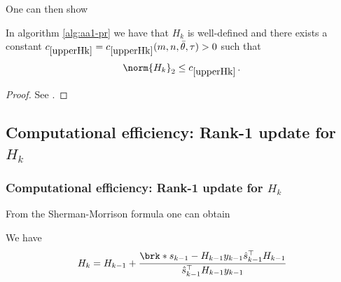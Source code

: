 
\begin{frame}
	One can then show
	\begin{lemma}
		In algorithm \ref{alg:aa1-pr} we have that $H_k$ is well-defined and there exists a constant $\useconstant{upperHk}=\useconstant{upperHk}(m,n, \bartheta,\tau)>0$ such that
		\begin{align*}
			\norm{H_k}_2\leq \useconstant{upperHk}\,.
		\end{align*}
	\end{lemma}
	\begin{proof}
		See \cite[Corollary 4]{ZhaAA}.
	\end{proof}
\end{frame}

\begin{frame}
	\centering
	\scalebox{0.9}{
	
	}
\end{frame}

\subsection{Computational efficiency: Rank-1 update for $H_k$}

\begin{frame}
	\frametitle{Computational efficiency: Rank-1 update for $H_k$}
	From the Sherman-Morrison formula one can obtain
	\begin{proposition}
		We have
		\begin{align*}
			H_{k} = H_{k-1}+\frac{\brk*{s_{k-1}-H_{k-1}y_{k-1}}\hs_{k-1}^\top H_{k-1}}{\hs_{k-1}^\top H_{k-1}y_{k-1}}
		\end{align*}
	\end{proposition}
\end{frame}


